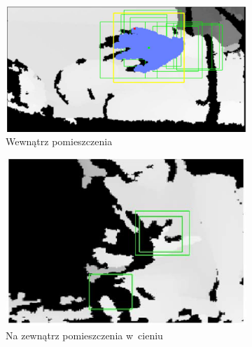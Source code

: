 \begin{savenotes}
	\begin{figure}[!htb]
		\captionsetup{singlelinecheck=off}
		\centering
		\begin{subfigure}[b]{0.32\textwidth}
			\centering
			\includegraphics[width=\textwidth]{images/kinectIndoor.png}	
			\caption{Wewnątrz pomieszczenia}
			\label{fig:characteristics:kinect:depthMapA}
		\end{subfigure}
		\hfill																																				
		\begin{subfigure}[b]{0.32\textwidth}
			\centering
			\includegraphics[width=\textwidth]{images/kinecOutdoorShade.png}		
			\caption{Na zewnątrz pomieszczenia w~cieniu}
			\label{fig:characteristics:kinect:depthMapB}
		\end{subfigure}
		\hfill																																
		\begin{subfigure}[b]{0.32\textwidth}
			\centering

\end{subfigure}
\end{figure}
\end{savenotes}
